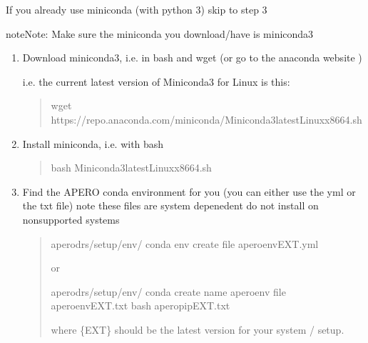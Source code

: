 \documentclass[a4paper,10pt,english]{report}
\begin{document}
If you already use miniconda (with python 3) skip to step 3

\begin{sphinxadmonition}{note}{Note:}
Make sure the miniconda you download/have is miniconda3
\end{sphinxadmonition}
\begin{enumerate}
%
\item {} 
Download miniconda3, i.e. in bash and wget (or go to the
anaconda website )

i.e. the current latest version of Miniconda3 for Linux is this:
\begin{quote}

\begin{sphinxVerbatim}[commandchars=\\\{\}]
wget https://repo.anaconda.com/miniconda/Miniconda3\PYGZhy{}latest\PYGZhy{}Linux\PYGZhy{}x86\PYGZus{}64.sh
\end{sphinxVerbatim}
\end{quote}

\item {} 
Install miniconda, i.e. with bash
\begin{quote}

\begin{sphinxVerbatim}[commandchars=\\\{\}]
bash Miniconda3\PYGZhy{}latest\PYGZhy{}Linux\PYGZhy{}x86\PYGZus{}64.sh
\end{sphinxVerbatim}
\end{quote}

\item {} 
Find the APERO conda environment for you (you can either use the yml or the
txt file) \sphinxhyphen{} note these files are system depenedent \sphinxhyphen{} do not install on
non\sphinxhyphen{}supported systems
\begin{quote}

\begin{sphinxVerbatim}[commandchars=\\\{\}]
 apero\PYGZhy{}drs/setup/env/
conda env create \PYGZhy{}\PYGZhy{}file apero\PYGZhy{}env\PYGZhy{}EXT.yml
\end{sphinxVerbatim}

or

\begin{sphinxVerbatim}[commandchars=\\\{\}]
 apero\PYGZhy{}drs/setup/env/
conda create \PYGZhy{}\PYGZhy{}name apero\PYGZhy{}env \PYGZhy{}\PYGZhy{}file apero\PYGZhy{}env\PYGZhy{}EXT.txt
bash apero\PYGZhy{}pip\PYGZhy{}EXT.txt
\end{sphinxVerbatim}

where \{EXT\} should be the latest version for your system / setup.
\end{quote}

\end{enumerate}
\end{document}
